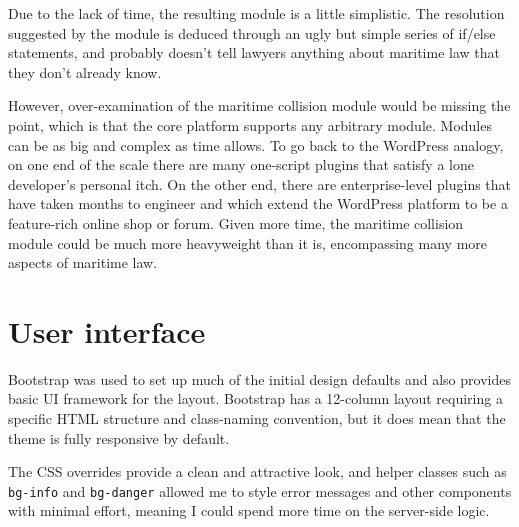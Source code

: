 Due to the lack of time, the resulting module is a little simplistic. The resolution suggested by the module is deduced through an ugly but simple series of if/else statements, and probably doesn't tell lawyers anything about maritime law that they don't already know.

However, over-examination of the maritime collision module would be missing the point, which is that the core platform supports any arbitrary module. Modules can be as big and complex as time allows. To go back to the WordPress analogy, on one end of the scale there are many one-script plugins that satisfy a lone developer's personal itch. On the other end, there are enterprise-level plugins that have taken months to engineer and which extend the WordPress platform to be a feature-rich online shop or forum. Given more time, the maritime collision module could be much more heavyweight than it is, encompassing many more aspects of maritime law.

\section{User interface}

Bootstrap was used to set up much of the initial design defaults and also provides basic UI framework for the layout. Bootstrap has a 12-column layout requiring a specific HTML structure and class-naming convention, but it does mean that the theme is fully responsive by default.

The CSS overrides provide a clean and attractive look, and helper classes such as \lstinline{bg-info} and \lstinline{bg-danger} allowed me to style error messages and other components with minimal effort, meaning I could spend more time on the server-side logic.
